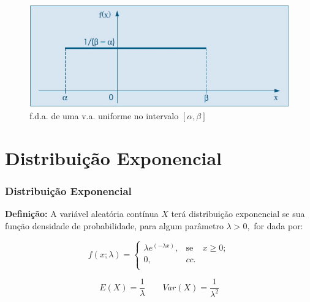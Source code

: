 \documentclass[14pt,aspectratio=1610]{beamer}
\begin{document}
\begin{frame}{}
\frametitle{}
\begin{block}{}
\justifying
\begin{figure}[H]
    \centering
    \includegraphics[scale=0.5]{figs/uniform}
    \caption{f.d.a. de uma v.a. uniforme no intervalo $[\alpha,\beta]$}
  \end{figure}
\end{block}
\end{frame}

\section{Distribuição Exponencial}
\begin{frame}{}
\frametitle{Distribuição Exponencial}
\begin{block}{}
\justifying
{\bf Definição:} A variável aleatória contínua $X$ terá distribuição exponencial se sua função densidade de probabilidade, para algum parâmetro $\lambda>0,$ for dada por:

$$
f(x;\lambda)=\left\{
\begin{array}{ccccc}
\lambda e^{(-\lambda x)}, & \textrm{se} & x\geq 0     ;\\
                       0, & cc.        & \\
\end{array}
\right.
$$

$$E(X)=\dfrac{1}{\lambda}\qquad Var(X)=\dfrac{1}{\lambda^{2}}$$
\end{block}
\end{frame}
\end{document}
